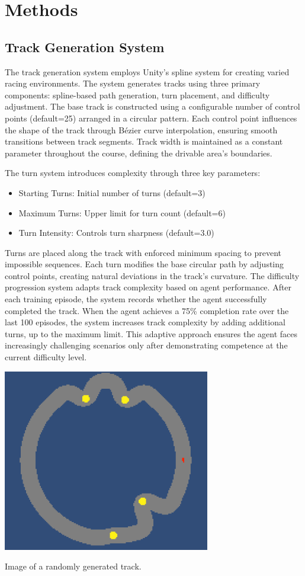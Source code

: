 \documentclass[10pt,twocolumn]{article}
\begin{document}
\section{Methods}

\subsection{Track Generation System}
The track generation system employs Unity's spline system for creating varied racing environments. The system generates tracks using three primary components: spline-based path generation, turn placement, and difficulty adjustment.
The base track is constructed using a configurable number of control points (default=25) arranged in a circular pattern. Each control point influences the shape of the track through Bézier curve interpolation, ensuring smooth transitions between track segments. Track width is maintained as a constant parameter throughout the course, defining the drivable area's boundaries.

The turn system introduces complexity through three key parameters:
\begin{itemize}
    \item Starting Turns: Initial number of turns (default=3)
    \item Maximum Turns: Upper limit for turn count (default=6)
    \item Turn Intensity: Controls turn sharpness (default=3.0)
\end{itemize}

Turns are placed along the track with enforced minimum spacing to prevent impossible sequences. Each turn modifies the base circular path by adjusting control points, creating natural deviations in the track's curvature.
The difficulty progression system adapts track complexity based on agent performance. After each training episode, the system records whether the agent successfully completed the track. When the agent achieves a 75\% completion rate over the last 100 episodes, the system increases track complexity by adding additional turns, up to the maximum limit. This adaptive approach ensures the agent faces increasingly challenging scenarios only after demonstrating competence at the current difficulty level.

\includegraphics[scale=.75]{track}
\caption{Image of a randomly generated track.}
\label{fig:track}
\end{document}

